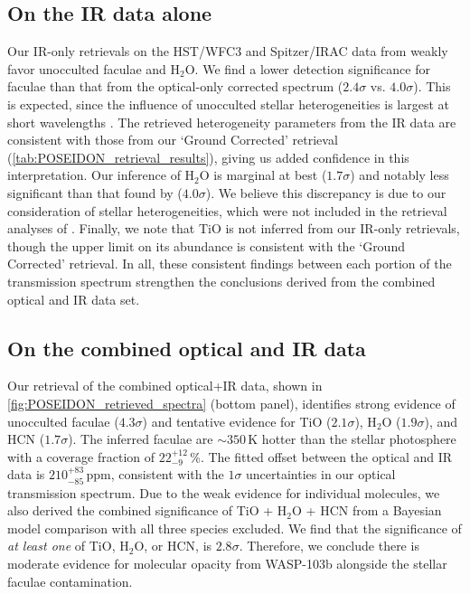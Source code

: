 \documentclass[twocolumn]{aastex63}
\begin{document}
\subsection{On the IR data alone}

Our IR-only retrievals on the HST/WFC3 and Spitzer/IRAC data from \citet{Kreidberg2018} weakly favor unocculted faculae and H$_2$O. We find a lower detection significance for faculae than that from the optical-only corrected spectrum ($2.4\sigma$ vs. $4.0\sigma$). This is expected, since the influence of unocculted stellar heterogeneities is largest at short wavelengths \citep[e.g.,][]{Rackham2018, Rackham2019}. The retrieved heterogeneity parameters from the IR data are consistent with those from our `Ground Corrected' retrieval (\autoref{tab:POSEIDON_retrieval_results}), giving us added confidence in this interpretation. Our inference of H$_2$O is marginal at best ($1.7\sigma$) and notably less significant than that found by \citet{Wilson2020} ($4.0\sigma$). We believe this discrepancy is due to our consideration of stellar heterogeneities, which were not included in the retrieval analyses of \citet{Wilson2020}. Finally, we note that TiO is not inferred from our IR-only retrievals, though the upper limit on its abundance is consistent with the `Ground Corrected' retrieval. In all, these consistent findings between each portion of the transmission spectrum strengthen the conclusions derived from the combined optical and IR data set.

\subsection{On the combined optical and IR data}

Our retrieval of the combined optical+IR data, shown in \autoref{fig:POSEIDON_retrieved_spectra} (bottom panel), identifies strong evidence of unocculted faculae ($4.3\sigma$) and tentative evidence for TiO ($2.1\sigma$), H$_2$O ($1.9\sigma$), and HCN ($1.7\sigma$). The inferred faculae are $\sim 350$\,K hotter than the stellar photosphere with a coverage fraction of $22^{+12}_{-9}$\,\%. The fitted offset between the optical and IR data is $210^{+83}_{-85}$\,ppm, consistent with the $1\sigma$ uncertainties in our optical transmission spectrum. Due to the weak evidence for individual molecules, we also derived the combined significance of TiO + H$_2$O + HCN from a Bayesian model comparison with all three species excluded. We find that the significance of \emph{at least one} of TiO, H$_2$O, or HCN, is $2.8\sigma$. Therefore, we conclude there is moderate evidence for molecular opacity from WASP-103b alongside the stellar faculae contamination. 
\end{document}

